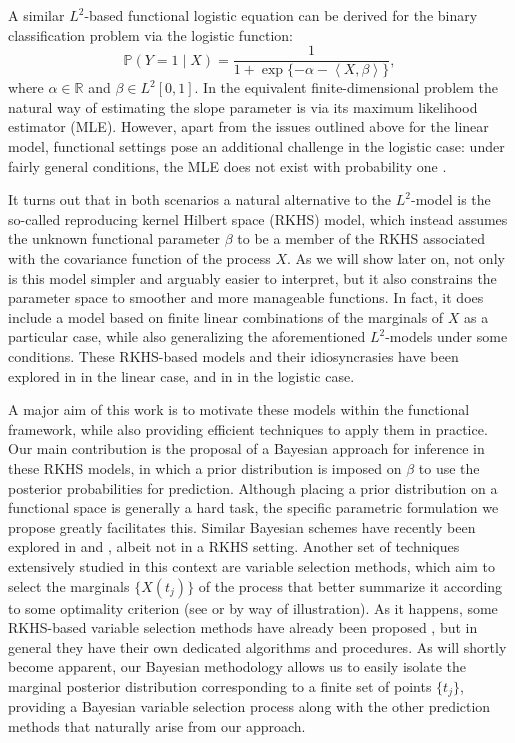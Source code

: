 \documentclass{article}
\numberwithin{equation}{section}
\theoremstyle{plain}
\theoremstyle{definition}
\newcommand{\R}{\mathbb{R}}
\newcommand\dotprod[2]{\left\langle#1,#2\right\rangle}
\begin{document}
A similar \(L^2\)-based functional logistic equation can be derived for the binary classification problem via the logistic function:
\begin{equation}\label{eq:l2-logistic-model}
  \mathbb P(Y=1 \mid X) = \frac{1}{1 + \exp\{-\alpha - \dotprod{X}{\beta}\}},
\end{equation}
where \(\alpha \in \R\) and \(\beta \in L^2[0, 1]\). In the equivalent finite-dimensional problem the natural way of estimating the slope parameter is via its maximum likelihood estimator (MLE). However, apart from the issues outlined above for the linear model, functional settings pose an additional challenge in the logistic case: under fairly general conditions, the MLE does not exist with probability one \citep[see][]{berrendero2023functional}.

It turns out that in both scenarios a natural alternative to the \(L^2\)-model is the so-called reproducing kernel Hilbert space (RKHS) model, which instead assumes the unknown functional parameter \(\beta\) to be a member of the RKHS associated with the covariance function of the process \(X\). As we will show later on, not only is this model simpler and arguably easier to interpret, but it also constrains the parameter space to smoother and more manageable functions. In fact, it does include a model based on finite linear combinations of the marginals of \(X\) as a particular case, while also generalizing the aforementioned \(L^2\)-models under some conditions. These RKHS-based models and their idiosyncrasies have been explored in \citet{berrendero2019rkhs, berrendero2024functional} in the linear case, and in \citet{berrendero2023functional} in the logistic case.

A major aim of this work is to motivate these models within the functional framework, while also providing efficient techniques to apply them in practice. Our main contribution is the proposal of a Bayesian approach for inference in these RKHS models, in which a prior distribution is imposed on \(\beta\) to use the posterior probabilities for prediction. Although placing a prior distribution on a functional space is generally a hard task, the specific parametric formulation we propose greatly facilitates this. Similar Bayesian schemes have recently been explored in \citet{grollemund2019bayesian} and \citet{abraham2024informative}, albeit not in a RKHS setting. Another set of techniques extensively studied in this context are variable selection methods, which aim to select the marginals \(\{X(t_j)\}\) of the process that better summarize it according to some optimality criterion (see \citealp{ferraty2010most} or \citealp{berrendero2016variable} by way of illustration). As it happens, some RKHS-based variable selection methods have already been proposed \citep[e.g.][]{bueno2019variable}, but in general they have their own dedicated algorithms and procedures. As will shortly become apparent, our Bayesian methodology allows us to easily isolate the marginal posterior distribution corresponding to a finite set of points \(\{t_j\}\), providing a Bayesian variable selection process along with the other prediction methods that naturally arise from our approach.
\end{document}
